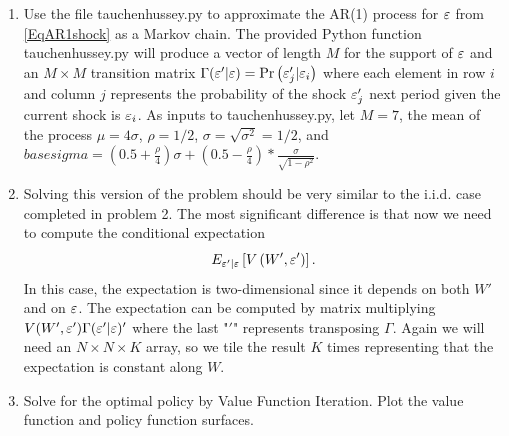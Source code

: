 \begin{problem}
\begin{enumerate}
   \item Use the file tauchenhussey.py to approximate the AR(1) process for $\varepsilon$ from \eqref{EqAR1shock} as a Markov chain. The provided Python function tauchenhussey.py will produce a vector of length $M$ for the support of $\varepsilon$ and an $M\times M$ transition matrix $\Gamma(\varepsilon'|\varepsilon)=\text{Pr}\left(\varepsilon_j'|\varepsilon_i\right)$ where each element in row $i$ and column $j$ represents the probability of the shock $\varepsilon_j'$ next period given the current shock is $\varepsilon_i$. As inputs to tauchenhussey.py, let $M=7$, the mean of the process $\mu=4\sigma$, $\rho = 1/2$, $\sigma=\sqrt{\sigma^2}=1/2$, and $basesigma=(0.5+\frac{\rho}{4})\sigma + (0.5 - \frac{\rho}{4})*\frac{\sigma}{\sqrt{1-\rho^2}}$.

  \item Solving this version of the problem should be very similar to the i.i.d. case completed in problem 2.  The most significant difference is that now we need to compute the conditional expectation
      \begin{equation}
      E_{\varepsilon'|\varepsilon}\left[V\left(W',\varepsilon'\right)\right].
      \end{equation}
      In this case, the expectation is two-dimensional since it depends on both $W'$ and on $\varepsilon$.  The expectation can be computed by matrix multiplying $V(W',\varepsilon')\Gamma(\varepsilon' | \varepsilon)'$ where the last "$'$" represents transposing $\Gamma$.  Again we will need an $N\times N\times K$ array, so we tile the result $K$ times representing that the expectation is constant along $W$.

  \item Solve for the optimal policy by Value Function Iteration.  Plot the value function and policy function surfaces.


\end{enumerate}
\end{problem} 